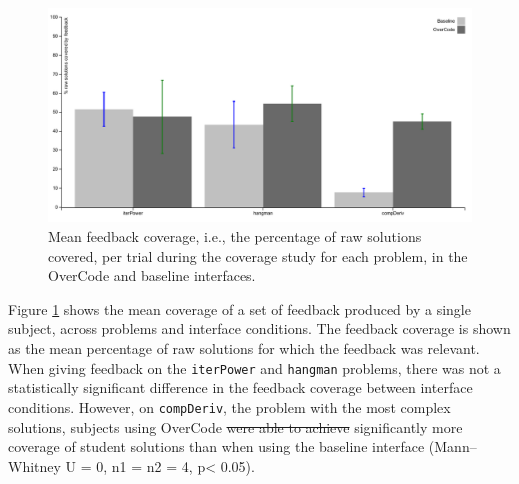 \documentclass[12pt,twoside]{mitthesis}
\newcommand \codevar[1]{\texttt{#1}}
\providecommand{\DIFaddtex}[1]{{\protect\color{blue}\uwave{#1}}} %
\providecommand{\DIFdeltex}[1]{{\protect\color{red}\sout{#1}}}                      %
\providecommand{\DIFaddbegin}{} %
\providecommand{\DIFaddend}{} %
\providecommand{\DIFdelbegin}{} %
\providecommand{\DIFdelend}{} %
\providecommand{\DIFadd}[1]{\texorpdfstring{\DIFaddtex{#1}}{#1}} %
\providecommand{\DIFdel}[1]{\texorpdfstring{\DIFdeltex{#1}}{}} %
\begin{document}
\begin{figure}[b!]
\includegraphics[width=0.6\paperwidth]{Body/figures/overcode/feedbackCoverage.pdf}
\caption{Mean feedback coverage, i.e., the percentage of raw solutions covered, per trial during the coverage study for each problem, in the OverCode and baseline interfaces.}
\label{aveCoveragePerPost}
\end{figure}

Figure \ref{aveCoveragePerPost} shows the mean coverage of a set of feedback produced by a single subject, across problems and interface conditions. The feedback coverage is shown as the mean percentage of raw solutions for which the feedback was relevant. When giving feedback on the \codevar{iterPower} and \codevar{hangman} problems, there was not a statistically significant difference in the feedback coverage between interface conditions. However, on \codevar{compDeriv}, the problem with the most complex solutions, subjects using OverCode \DIFdelbegin \DIFdel{were able to achieve }\DIFdelend \DIFaddbegin \DIFadd{achieved }\DIFaddend significantly more coverage of student solutions than when using the baseline interface (Mann--Whitney U = 0, n1 = n2 = 4, p< 0.05).
\end{document}
